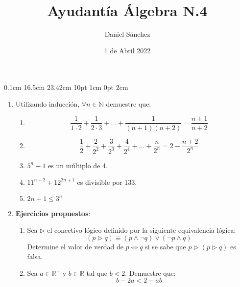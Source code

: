 \documentclass[12pt]{article}
\newcommand{\D}{\displaystyle}
\begin{document}
\setmargins{2.5cm}
{0.1cm}
{16.5cm}
{23.42cm}
{10pt}
{1cm}
{0pt}
{2cm}

\title{Ayudant\'ia \'Algebra N.4}
\date{1 de Abril 2022}
\author{Daniel S\'anchez}
\maketitle

\begin{enumerate}
      \item Utilizando inducci\'on, $\forall n \in \mathbb{N}$ demuestre que:
            \begin{enumerate}
                  \item 
                        $$\D \frac{1}{1 \cdot 2}+\frac{1}{2\cdot 3}+...+\frac{1}{(n+1)(n+2)}=\frac{n+1}{n+2}$$
                  \item 
                        $$\frac{1}{2}+\frac{2}{2^2}+\frac{3}{2^3}+\frac{4}{2^4}+...+\frac{n}{2^n}=2-\frac{n+2}{2^n}$$
                  \item $5^{n}-1$ es un m\'ultiplo de 4.
                  \item $\D 11^{n+2}+12^{2n+1}$ es divisible por 133.
                  \item $2n+1\leq 3^n$
            \end{enumerate}
      \item \textbf{Ejercicios propuestos}:
            \begin{enumerate}
                  \item Sea $\triangleright$ el conectivo l\'ogico definido por la siguiente equivalencia l\'ogica:
                        $$(p \triangleright q)\equiv (p \land \neg q) \lor (\neg p \land q)$$
                        Determine el valor de verdad de $p \Leftrightarrow q$ si se sabe que $p \triangleright (p \triangleright q)$ es falsa.
                  \item Sea $a \in \mathbb{R}^+$ y $b \in \mathbb{R}$ tal que $b<2$. Demuestre que:
                        $$b-2a<2-ab$$
            \end{enumerate}
\end{enumerate}
\end{document}
